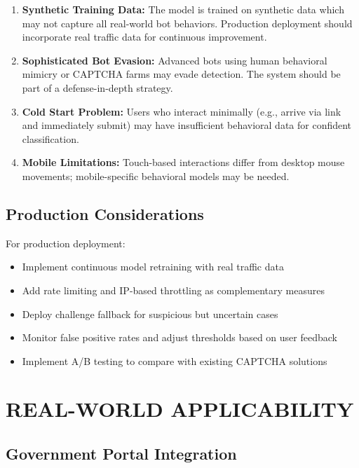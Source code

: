 \begin{enumerate}
    \item \textbf{Synthetic Training Data:} The model is trained on synthetic data which may not capture all real-world bot behaviors. Production deployment should incorporate real traffic data for continuous improvement.
    
    \item \textbf{Sophisticated Bot Evasion:} Advanced bots using human behavioral mimicry or CAPTCHA farms may evade detection. The system should be part of a defense-in-depth strategy.
    
    \item \textbf{Cold Start Problem:} Users who interact minimally (e.g., arrive via link and immediately submit) may have insufficient behavioral data for confident classification.
    
    \item \textbf{Mobile Limitations:} Touch-based interactions differ from desktop mouse movements; mobile-specific behavioral models may be needed.
\end{enumerate}

\subsection{Production Considerations}

For production deployment:
\begin{itemize}
    \item Implement continuous model retraining with real traffic data
    \item Add rate limiting and IP-based throttling as complementary measures
    \item Deploy challenge fallback for suspicious but uncertain cases
    \item Monitor false positive rates and adjust thresholds based on user feedback
    \item Implement A/B testing to compare with existing CAPTCHA solutions
\end{itemize}

\section{REAL-WORLD APPLICABILITY}

\subsection{Government Portal Integration}

